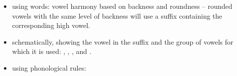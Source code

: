 \begin{refsection}
\begin{mysolution}
\begin{itemize}
\item using words: vowel harmony based on backness and roundness -- rounded vowels with the same level of backness will use a suffix containing the corresponding high vowel.
\item schematically, showing the vowel in the suffix and the group of vowels for which it is used: , , , and .
\item using phonological rules:
\end{itemize}



\end{mysolution}
\end{refsection}
